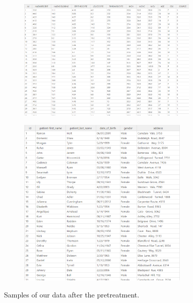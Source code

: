 \begin{figure}[h!]
  \begin{subfigure}{.55\textwidth}
      \center
      \includegraphics[width=0.95\textwidth]{images/chapter3/pretartmntData/labtests.PNG}
  \end{subfigure}
  \begin{subfigure}{.55\textwidth}
    \center
    \includegraphics[width=0.90\textwidth]{images/chapter3/pretartmntData/patientInfo.PNG}
    
\end{subfigure}
  
  \caption{Samples of our data after the pretreatment.}
  
\end{figure}

